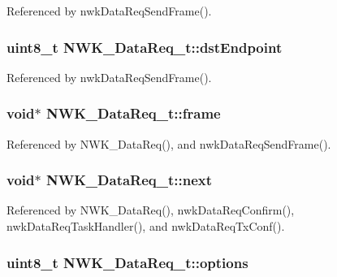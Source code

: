Referenced by nwk\-Data\-Req\-Send\-Frame().

\hypertarget{struct_n_w_k___data_req__t_ae75d2ea1c6fc4ad9dd7836891b5e9d31}{
\subsubsection[{dst\-Endpoint}]{\setlength{\rightskip}{0pt plus 5cm}uint8\-\_\-t N\-W\-K\-\_\-\-Data\-Req\-\_\-t\-::dst\-Endpoint}}\label{struct_n_w_k___data_req__t_ae75d2ea1c6fc4ad9dd7836891b5e9d31}


Referenced by nwk\-Data\-Req\-Send\-Frame().

\hypertarget{struct_n_w_k___data_req__t_a235bf18122d436409f1802efbfe81052}{
\subsubsection[{frame}]{\setlength{\rightskip}{0pt plus 5cm}void$\ast$ N\-W\-K\-\_\-\-Data\-Req\-\_\-t\-::frame}}\label{struct_n_w_k___data_req__t_a235bf18122d436409f1802efbfe81052}


Referenced by N\-W\-K\-\_\-\-Data\-Req(), and nwk\-Data\-Req\-Send\-Frame().

\hypertarget{struct_n_w_k___data_req__t_ad65dbd940c857fd96647bd144af3b44e}{
\subsubsection[{next}]{\setlength{\rightskip}{0pt plus 5cm}void$\ast$ N\-W\-K\-\_\-\-Data\-Req\-\_\-t\-::next}}\label{struct_n_w_k___data_req__t_ad65dbd940c857fd96647bd144af3b44e}


Referenced by N\-W\-K\-\_\-\-Data\-Req(), nwk\-Data\-Req\-Confirm(), nwk\-Data\-Req\-Task\-Handler(), and nwk\-Data\-Req\-Tx\-Conf().

\hypertarget{struct_n_w_k___data_req__t_af6f70d81c7dd2d4351ab36df18fbf074}{
\subsubsection[{options}]{\setlength{\rightskip}{0pt plus 5cm}uint8\-\_\-t N\-W\-K\-\_\-\-Data\-Req\-\_\-t\-::options}}\label{struct_n_w_k___data_req__t_af6f70d81c7dd2d4351ab36df18fbf074}


